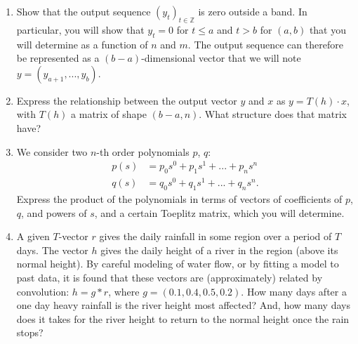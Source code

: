 \documentclass[11pt]{article}
\begin{document}
\begin{enumerate}
    \item Show that the output sequence $(y_t)_{t \in \mathbb{Z}}$ is zero outside a band. In particular, you will show that $y_t = 0$ for $t \leq a$ and $t > b$ for $(a, b)$ that you will determine as a function of $n$ and $m$. The output sequence can therefore be represented as a $(b-a)$-dimensional vector that we will note $y = (y_{a+1}, ..., y_{b})$.

    \item Express the relationship between the output vector $y$ and $x$ as $y = T(h) \cdot x$, with $T(h)$ a matrix of shape $(b-a, n)$. What structure does that matrix have?

    \item We consider two $n$-th order polynomials $p$, $q$:
    \begin{align*}
        p(s) &= p_0s^0 + p_1s^1 + ... + p_ns^n \\
        q(s) &= q_0s^0 + q_1s^1 + ... + q_ns^n.
    \end{align*}
    Express the product of the polynomials in terms of vectors of coefficients of $p$, $q$, and powers of $s$, and a certain Toeplitz matrix, which you will determine.

    \item A given $T$-vector $r$ gives the daily rainfall in some region over a period of $T$ days. The vector $h$ gives the daily height of a river in the region (above its normal height). By careful modeling of water flow, or by fitting a model to past data, it is found that these vectors are (approximately) related by convolution: $h=g*r$, where $g= (0.1,0.4,0.5,0.2)$. How  many days  after a  one day heavy rainfall is the river height most affected? And, how many days does it takes for the river height to return to the normal height once the rain stops?
\end{enumerate}
\end{document}
